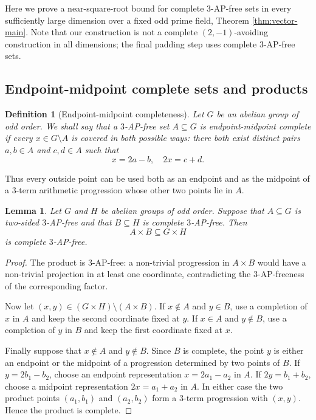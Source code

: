 \documentclass[11pt]{article}
\newtheorem{lemma}[theorem]{Lemma}
\newtheorem{definition}[theorem]{Definition}
\begin{document}
	Here we prove   a near-square-root bound for complete
	$3$-AP-free sets in every sufficiently large dimension over a fixed odd prime
	field, Theorem \ref{thm:vector-main}. Note that our construction is not a complete $(2,-1)$-avoiding construction in
	all dimensions; the final padding step uses  complete $3$-AP-free sets.
	
	
	\subsection{Endpoint-midpoint complete  sets and products}
	
	\begin{definition}[Endpoint-midpoint completeness]
		Let $G$ be an abelian group of odd order.  We shall say that a $3$-AP-free set
		$A\subseteq G$ is \emph{endpoint-midpoint complete } if every $x\in G\setminus A$ is
		covered in both possible ways: there both exist  distinct  pairs  $a,b\in A$ and $c,d\in A$ such that
		\[
		x=2a-b, \quad 2x=c+d.
		\]
		
	\end{definition}
	
	Thus every outside point can be used both as an endpoint and as the midpoint of
	a $3$-term arithmetic progression whose other two points lie in $A$.
	
	\begin{lemma}\label{lem:twosided-product}
		Let $G$ and $H$ be abelian groups of odd order.  Suppose that
		$A\subseteq G$ is two-sided $3$-AP-free and that
		$B\subseteq H$ is complete $3$-AP-free.  Then
		\[
		A\times B\subseteq G\times H
		\]
		is complete $3$-AP-free.
	\end{lemma}
	
	\begin{proof}
		The product is $3$-AP-free: a non-trivial progression in $A\times B$ would have
		a non-trivial projection in at least one coordinate, contradicting the
		$3$-AP-freeness of the corresponding factor.
		
		Now let $(x,y)\in (G\times H)\setminus(A\times B)$.  If $x\notin A$ and
		$y\in B$, use a completion of $x$ in $A$ and keep the second
		coordinate fixed at $y$.  If $x\in A$ and $y\notin B$, use a completion of $y$
		in $B$ and keep the first coordinate fixed at $x$.
		
		Finally suppose that $x\notin A$ and $y\notin B$.  Since $B$ is complete, the
		point $y$ is either an endpoint or the midpoint of a progression determined by
		two points of $B$.  If $y=2b_1-b_2$, choose an endpoint representation
		$x=2a_1-a_2$ in $A$.  If $2y=b_1+b_2$, choose a midpoint representation
		$2x=a_1+a_2$ in $A$.  In either case the two product points
		$(a_1,b_1)$ and $(a_2,b_2)$ form a $3$-term progression with $(x,y)$.  Hence the
		product is complete.
	\end{proof}
	
\end{document}
